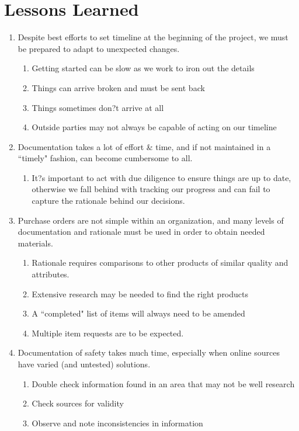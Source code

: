 \documentclass{article}
\begin{document}
\section{Lessons Learned}
\begin{enumerate}
\item Despite best efforts to set timeline at the beginning of the project, we must be prepared to adapt to unexpected changes.
\begin{enumerate}
\item Getting started can be slow as we work to iron out the details
\item Things can arrive broken and must be sent back
\item Things sometimes don?t arrive at all
\item Outside parties may not always be capable of acting on our timeline
\end{enumerate}
\item Documentation takes a lot of effort \& time, and if not maintained in a ``timely" fashion, can become cumbersome to all.
\begin{enumerate}
\item It?s important to act with due diligence to ensure things are up to date, otherwise we fall behind with tracking our progress and can fail to capture the rationale behind our decisions.
\end{enumerate}
\item Purchase orders are not simple within an organization, and many levels of documentation and rationale must be used in order to obtain needed materials.
\begin{enumerate}
\item Rationale requires comparisons to other products of similar quality and attributes.
\item Extensive research may be needed to find the right products
\item A ``completed" list of items will always need to be amended
\item Multiple item requests are to be expected.
\end{enumerate}
\item Documentation of safety takes much time, especially when online sources have varied (and untested) solutions.
\begin{enumerate}
\item Double check information found in an area that may not be well research
\item Check sources for validity
\item Observe and note inconsistencies in information

\end{enumerate}
\end{enumerate}
\end{document}
